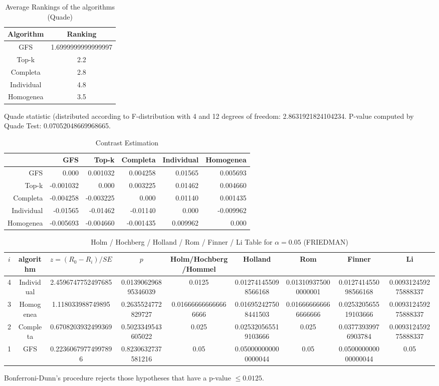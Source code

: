 \documentclass[a4paper,10pt]{article}
\begin{document}
\begin{landscape}
\newpage

\begin{table}[!htp]
\centering
\caption{Average Rankings of the algorithms (Quade)
}\begin{tabular}{c|c}
Algorithm&Ranking\\
\hline
GFS&1.6999999999999997\\
Top-k&2.2\\
Completa&2.8\\
Individual&4.8\\
Homogenea&3.5\\
\end{tabular}
\end{table}
Quade statistic (distributed according to F-distribution with 4 and 12 degrees of freedom: 2.8631921824104234. 
P-value computed by Quade Test: 0.07052048669968665.\newline


\newpage

\begin{table}[!htp]
\centering\tiny
\caption{Contrast Estimation}
\begin{tabular}{
|r|r|r|r|r|r|}
\hline
 &GFS&Top-k&Completa&Individual&Homogenea\\
\hline
GFS&0.000&0.001032&0.004258&0.01565&0.005693\\
\hline
Top-k&-0.001032&0.000&0.003225&0.01462&0.004660\\
\hline
Completa&-0.004258&-0.003225&0.000&0.01140&0.001435\\
\hline
Individual&-0.01565&-0.01462&-0.01140&0.000&-0.009962\\
\hline
Homogenea&-0.005693&-0.004660&-0.001435&0.009962&0.000\\
\hline

\end{tabular}
\end{table}

\newpage

\begin{table}[!htp]
\centering\scriptsize
\caption{Holm / Hochberg / Holland / Rom / Finner / Li Table for $\alpha=0.05$ (FRIEDMAN)}
\begin{tabular}{ccccccccc}
$i$&algorithm&$z=(R_0 - R_i)/SE$&$p$&Holm/Hochberg/Hommel&Holland&Rom&Finner&Li\\
\hline
4&Individual&2.4596747752497685&0.013906296895346039&0.0125&0.012741455098566168&0.013109375000000001&0.012741455098566168&0.009312459275888337\\
3&Homogenea&1.118033988749895&0.2635524772829727&0.016666666666666666&0.016952427508441503&0.016666666666666666&0.025320565519103666&0.009312459275888337\\
2&Completa&0.6708203932499369&0.5023349543605022&0.025&0.025320565519103666&0.025&0.03773939976903784&0.009312459275888337\\
1&GFS&0.22360679774997896&0.8230632737581216&0.05&0.050000000000000044&0.05&0.050000000000000044&0.05\\
\hline
\end{tabular}
\end{table}
Bonferroni-Dunn's procedure rejects those hypotheses that have a p-value $\le0.0125$.



\end{landscape}
\end{document}
